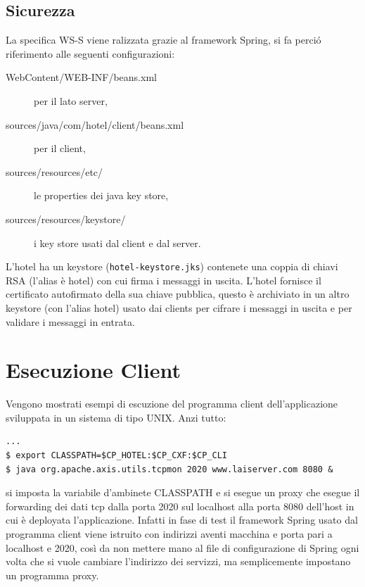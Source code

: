 \documentclass[a4paper]{article}
\begin{document}

\subsection{Sicurezza}

La specifica WS-S viene ralizzata grazie al framework Spring, si fa
perci\'o riferimento alle seguenti configurazioni:
\begin{description}
\item [WebContent/WEB-INF/beans.xml] per il lato server,
\item [sources/java/com/hotel/client/beans.xml] per il client,
\item [sources/resources/etc/] le properties dei java key store,
\item [sources/resources/keystore/] i key store usati dal client e dal
  server.
\end{description}
L'hotel ha un keystore (\verb'hotel-keystore.jks') contenete una
coppia di chiavi RSA (l'alias \`e hotel) con cui firma i messaggi in
uscita. L'hotel fornisce il certificato autofirmato della sua chiave
pubblica, questo \`e archiviato in un altro keystore (con l'alias
hotel) usato dai clients per cifrare i messaggi in uscita e per
validare i messaggi in entrata.


\section{Esecuzione Client}
Vengono mostrati esempi di escuzione del programma client
dell'applicazione sviluppata in un sistema di tipo UNIX. 
Anzi tutto:
\begin{verbatim}
...
$ export CLASSPATH=$CP_HOTEL:$CP_CXF:$CP_CLI
$ java org.apache.axis.utils.tcpmon 2020 www.laiserver.com 8080 &
\end{verbatim}
si imposta la variabile d'ambinete CLASSPATH e si esegue un proxy che
esegue il forwarding dei dati tcp dalla porta 2020 sul localhost alla
porta 8080 dell'host in cui \`e deployata l'applicazione. Infatti in
fase di test il framework Spring usato dal programma client viene
istruito con indirizzi aventi macchina e porta pari a localhost e
2020, cos\`i da non mettere mano al file di configurazione di Spring
ogni volta che si vuole cambiare l'indirizzo dei servizzi, ma
semplicemente impostano un programma proxy. 
\end{document}
